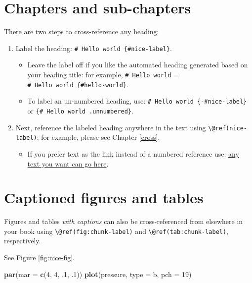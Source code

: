 \documentclass[
]{book}
\newenvironment{Shaded}{\begin{snugshade}}{\end{snugshade}}
\newcommand{\AttributeTok}[1]{\textcolor[rgb]{0.13,0.29,0.53}{#1}}
\newcommand{\DecValTok}[1]{\textcolor[rgb]{0.00,0.00,0.81}{#1}}
\newcommand{\FunctionTok}[1]{\textcolor[rgb]{0.13,0.29,0.53}{\textbf{#1}}}
\newcommand{\NormalTok}[1]{#1}
\newcommand{\StringTok}[1]{\textcolor[rgb]{0.31,0.60,0.02}{#1}}
\providecommand{\tightlist}{%
  \setlength{\itemsep}{0pt}\setlength{\parskip}{0pt}}
\theoremstyle{definition}
\theoremstyle{definition}
\theoremstyle{definition}
\theoremstyle{definition}
\theoremstyle{remark}
\begin{document}
\section{Chapters and sub-chapters}\label{chapters-and-sub-chapters}

There are two steps to cross-reference any heading:

\begin{enumerate}
\def\labelenumi{\arabic{enumi}.}
\tightlist
\item
  Label the heading: \texttt{\#\ Hello\ world\ \{\#nice-label\}}.

  \begin{itemize}
  \tightlist
  \item
    Leave the label off if you like the automated heading generated based on your heading title: for example, \texttt{\#\ Hello\ world} = \texttt{\#\ Hello\ world\ \{\#hello-world\}}.
  \item
    To label an un-numbered heading, use: \texttt{\#\ Hello\ world\ \{-\#nice-label\}} or \texttt{\{\#\ Hello\ world\ .unnumbered\}}.
  \end{itemize}
\item
  Next, reference the labeled heading anywhere in the text using \texttt{\textbackslash{}@ref(nice-label)}; for example, please see Chapter \ref{cross}.

  \begin{itemize}
  \tightlist
  \item
    If you prefer text as the link instead of a numbered reference use: \hyperref[cross]{any text you want can go here}.
  \end{itemize}
\end{enumerate}

\section{Captioned figures and tables}\label{captioned-figures-and-tables}

Figures and tables \emph{with captions} can also be cross-referenced from elsewhere in your book using \texttt{\textbackslash{}@ref(fig:chunk-label)} and \texttt{\textbackslash{}@ref(tab:chunk-label)}, respectively.

See Figure \ref{fig:nice-fig}.

\begin{Shaded}
\begin{Highlighting}[]
\FunctionTok{par}\NormalTok{(}\AttributeTok{mar =} \FunctionTok{c}\NormalTok{(}\DecValTok{4}\NormalTok{, }\DecValTok{4}\NormalTok{, .}\DecValTok{1}\NormalTok{, .}\DecValTok{1}\NormalTok{))}
\FunctionTok{plot}\NormalTok{(pressure, }\AttributeTok{type =} \StringTok{\textquotesingle{}b\textquotesingle{}}\NormalTok{, }\AttributeTok{pch =} \DecValTok{19}\NormalTok{)}
\end{Highlighting}
\end{Shaded}
\end{document}

